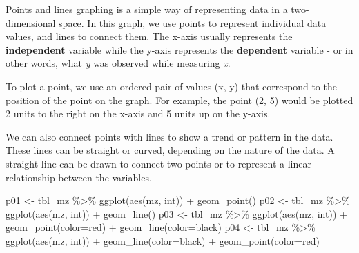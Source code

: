\documentclass[
]{book}
\newenvironment{Shaded}{\begin{snugshade}}{\end{snugshade}}
\newcommand{\AttributeTok}[1]{\textcolor[rgb]{0.77,0.63,0.00}{#1}}
\newcommand{\FunctionTok}[1]{\textcolor[rgb]{0.00,0.00,0.00}{#1}}
\newcommand{\NormalTok}[1]{#1}
\newcommand{\OtherTok}[1]{\textcolor[rgb]{0.56,0.35,0.01}{#1}}
\newcommand{\SpecialCharTok}[1]{\textcolor[rgb]{0.00,0.00,0.00}{#1}}
\newcommand{\StringTok}[1]{\textcolor[rgb]{0.31,0.60,0.02}{#1}}
\begin{document}
Points and lines graphing is a simple way of representing data in a two-dimensional space. In this graph, we use points to represent individual data values, and lines to connect them. The x-axis usually represents the \textbf{independent} variable while the y-axis represents the \textbf{dependent} variable - or in other words, what \emph{y} was observed while measuring \emph{x}.

To plot a point, we use an ordered pair of values (x, y) that correspond to the position of the point on the graph. For example, the point (2, 5) would be plotted 2 units to the right on the x-axis and 5 units up on the y-axis.

We can also connect points with lines to show a trend or pattern in the data. These lines can be straight or curved, depending on the nature of the data. A straight line can be drawn to connect two points or to represent a linear relationship between the variables.

\begin{Shaded}
\begin{Highlighting}[]
\NormalTok{p01 }\OtherTok{\textless{}{-}}\NormalTok{ tbl\_mz }\SpecialCharTok{\%\textgreater{}\%} \FunctionTok{ggplot}\NormalTok{(}\FunctionTok{aes}\NormalTok{(mz, int)) }\SpecialCharTok{+} \FunctionTok{geom\_point}\NormalTok{()}
\NormalTok{p02 }\OtherTok{\textless{}{-}}\NormalTok{ tbl\_mz }\SpecialCharTok{\%\textgreater{}\%} \FunctionTok{ggplot}\NormalTok{(}\FunctionTok{aes}\NormalTok{(mz, int)) }\SpecialCharTok{+} \FunctionTok{geom\_line}\NormalTok{()}
\NormalTok{p03 }\OtherTok{\textless{}{-}}\NormalTok{ tbl\_mz }\SpecialCharTok{\%\textgreater{}\%} \FunctionTok{ggplot}\NormalTok{(}\FunctionTok{aes}\NormalTok{(mz, int)) }\SpecialCharTok{+} \FunctionTok{geom\_point}\NormalTok{(}\AttributeTok{color=}\StringTok{\textquotesingle{}red\textquotesingle{}}\NormalTok{) }\SpecialCharTok{+} \FunctionTok{geom\_line}\NormalTok{(}\AttributeTok{color=}\StringTok{\textquotesingle{}black\textquotesingle{}}\NormalTok{)}
\NormalTok{p04 }\OtherTok{\textless{}{-}}\NormalTok{ tbl\_mz }\SpecialCharTok{\%\textgreater{}\%} \FunctionTok{ggplot}\NormalTok{(}\FunctionTok{aes}\NormalTok{(mz, int)) }\SpecialCharTok{+} \FunctionTok{geom\_line}\NormalTok{(}\AttributeTok{color=}\StringTok{\textquotesingle{}black\textquotesingle{}}\NormalTok{) }\SpecialCharTok{+} \FunctionTok{geom\_point}\NormalTok{(}\AttributeTok{color=}\StringTok{\textquotesingle{}red\textquotesingle{}}\NormalTok{)}
\end{Highlighting}
\end{Shaded}
\end{document}
